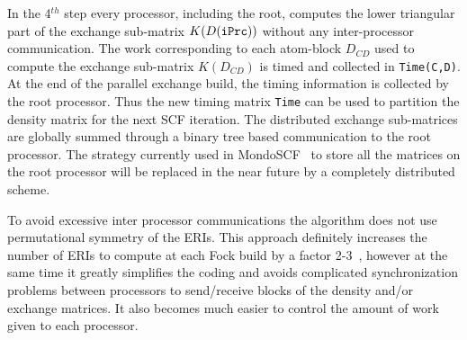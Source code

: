 \documentclass[prl,twocolumn,twocolumngrid,superbib]{revtex4} %
\begin{document}
 In the 4$^{th}$ step every processor, including the root, computes 
 the lower triangular part of the exchange sub-matrix $K(D({\tt iPrc}))$ 
 without any inter-processor communication. 
 The work corresponding to each atom-block
 $D_{CD}$ used to compute the exchange 
 sub-matrix $K(D_{CD})$ is timed and collected in {\tt Time(C,D)}.
 At the end of the parallel exchange build, 
 the timing information is collected by the root processor.
 Thus the new timing matrix {\tt Time} can be used to partition the density 
 matrix for the next SCF iteration.
 The distributed exchange sub-matrices are globally 
 summed through a binary tree based communication to the root processor.
 The strategy currently used in {\sc MondoSCF}~\cite{MondoSCF_1.0-alpha-10} to store all the matrices on 
 the root processor will be replaced in the near future
 by a completely distributed scheme.
 
 To avoid excessive inter processor communications the algorithm 
 does not use permutational symmetry of the ERIs. This approach
 definitely increases the number of ERIs to compute at each Fock build by a factor 2-3~\cite{ESchwegler00},
 however at the same time it greatly simplifies the coding and avoids complicated
 synchronization problems between processors to send/receive blocks of the 
 density and/or exchange matrices. It also becomes much 
 easier to control the amount of work given to each processor.


\end{document}
